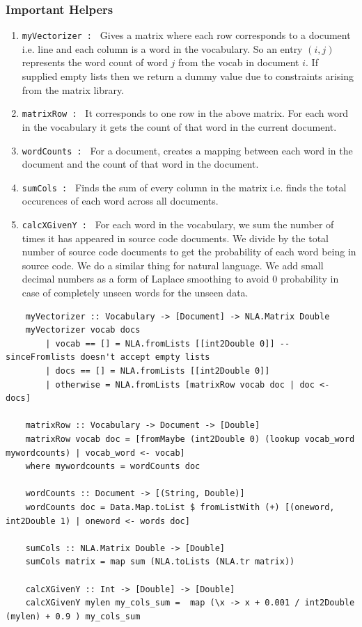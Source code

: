 \documentclass[12pt]{scrreprt}
\newcommand{\ttt}[1]{\texttt{#1}}
\begin{document}
\subsubsection{Important Helpers}
\begin{enumerate}
    \item \ttt{myVectorizer : } Gives a matrix where each row corresponds to a document i.e. line and each column is a word in the vocabulary. So an entry $(i,j)$ represents the word count of word $j$ from the vocab in document $i$. If supplied empty lists then we return a dummy value due to constraints arising from the matrix library.
    \item \ttt{matrixRow : } It corresponds to one row in the above matrix. For each word in the vocabulary it gets the count of that word in the current document.
    \item \ttt{wordCounts : } For a document, creates a mapping between each word in the document and the count of that word in the document.
    \item \ttt{sumCols : } Finds the sum of every column in the matrix i.e. finds the total occurences of each word across all documents.
    \item \ttt{calcXGivenY : } For each word in the vocabulary, we sum the number of times it has appeared in source code documents. We divide by the total number of source code documents to get the probability of each word being in source code. We do a similar thing for natural language. We add small decimal numbers as a form of Laplace smoothing to avoid 0 probability in case of completely unseen words for the unseen data.
\end{enumerate}

\begin{verbatim}
    myVectorizer :: Vocabulary -> [Document] -> NLA.Matrix Double
    myVectorizer vocab docs
        | vocab == [] = NLA.fromLists [[int2Double 0]] -- sinceFromlists doesn't accept empty lists
        | docs == [] = NLA.fromLists [[int2Double 0]]
        | otherwise = NLA.fromLists [matrixRow vocab doc | doc <- docs]

    matrixRow :: Vocabulary -> Document -> [Double]
    matrixRow vocab doc = [fromMaybe (int2Double 0) (lookup vocab_word mywordcounts) | vocab_word <- vocab]
    where mywordcounts = wordCounts doc

    wordCounts :: Document -> [(String, Double)]
    wordCounts doc = Data.Map.toList $ fromListWith (+) [(oneword, int2Double 1) | oneword <- words doc]

    sumCols :: NLA.Matrix Double -> [Double]
    sumCols matrix = map sum (NLA.toLists (NLA.tr matrix))

    calcXGivenY :: Int -> [Double] -> [Double]
    calcXGivenY mylen my_cols_sum =  map (\x -> x + 0.001 / int2Double (mylen) + 0.9 ) my_cols_sum

   \end{verbatim}
\end{document}
